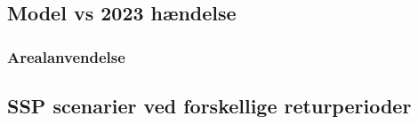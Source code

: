 

\subsection{Model vs 2023 hændelse}
\subsubsection{Arealanvendelse}

\subsection{SSP scenarier ved forskellige returperioder}